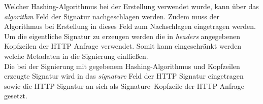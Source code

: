{	Welcher Hashing-Algorithmus bei der Erstellung verwendet wurde, kann über das \textit{algorithm} Feld der Signatur nachgeschlagen werden. Zudem muss der Algorithmus bei Erstellung in dieses Feld zum Nachschlagen eingetragen werden.\\
	
	Um die eigentliche Signatur zu erzeugen werden die in \textit{headers} angegebenen Kopfzeilen der HTTP Anfrage verwendet. Somit kann eingeschränkt werden welche Metadaten in die Signierung einfließen.\\
	
	Die bei der Signierung mit gegebenem Hashing-Algorithmus und Kopfzeilen erzeugte Signatur wird in das \textit{signature} Feld der HTTP Signatur eingetragen sowie die HTTP Signatur an sich als \glqq Signature\grqq~Kopfzeile der HTTP Anfrage gesetzt.\cite{http-signature}\\
}
		
